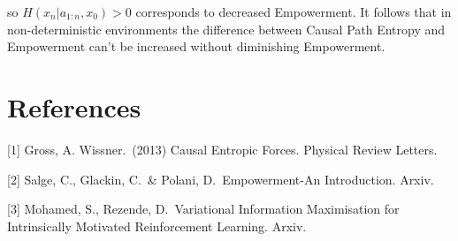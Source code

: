 \documentclass{article}
\begin{document}
so $H(x_n|a_{1:n},x_0) > 0$ corresponds to decreased Empowerment. It follows that in non-deterministic environments the difference between Causal Path Entropy and Empowerment can't be increased without diminishing Empowerment. 

\section*{References}

\small

[1] Gross, A. Wissner.\ (2013) Causal Entropic Forces. Physical Review Letters.

[2] Salge, C., Glackin, C.\ \& Polani, D.\ Empowerment-An Introduction. Arxiv. 

[3] Mohamed, S., Rezende, D.\ Variational Information Maximisation for Intrinsically Motivated Reinforcement Learning. Arxiv. 
\end{document}
